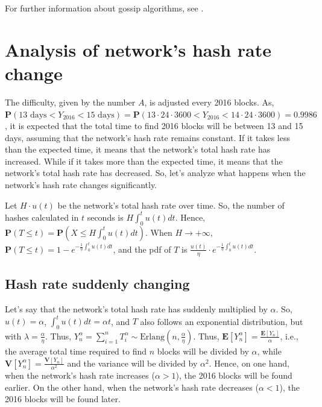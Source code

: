For further information about gossip algorithms, see \citet{shah2009gossip}.


\section{Analysis of network's hash rate change}

The difficulty, given by the number $A$, is adjusted every 2016 blocks. As, $\mathbf{P}(13 \text{ days} < Y_{2016} < 15 \text{ days}) = \mathbf{P}(13 \cdot 24 \cdot 3600 < Y_{2016} < 14 \cdot 24 \cdot 3600) = 0.9986$, it is expected that the total time to find 2016 blocks will be between 13 and 15 days, assuming that the network's hash rate remains constant. If it takes less than the expected time, it means that the network's total hash rate has increased. While if it takes more than the expected time, it means that the network's total hash rate has decreased. So, let's analyze what happens when the network's hash rate changes significantly.


Let $H \cdot u(t)$ be the network's total hash rate over time. So, the number of hashes calculated in $t$ seconds is $H \int_0^t u(t) dt$. Hence, $\mathbf{P}(T \leq t) = \mathbf{P}(X \leq H \int_0^t u(t)dt)$. When $H \rightarrow +\infty$, $\mathbf{P}(T \leq t) = 1 - e^{-\frac{1}{\eta} \int_0^t u(t) dt}$, and the pdf of $T$ is $\frac{u(t)}{\eta} \cdot e^{-\frac{1}{\eta} \int_0^t u(t)dt}$.

\subsection{Hash rate suddenly changing}

Let's say that the network's total hash rate has suddenly multiplied by $\alpha$. So, $u(t) = \alpha$, $\int_0^t u(t) dt = \alpha t$, and $T$ also follows an exponential distribution, but with $\lambda = \frac{\alpha}{\eta}$. Thus, $Y_n^\alpha = \sum_{i=1}^{n} T_i^\alpha \sim \text{Erlang}(n, \frac{\alpha}{\eta})$. Thus, $\mathbf{E}[Y_{n}^\alpha] = \frac{\mathbf{E}[Y_{n}]}{\alpha}$, i.e., the average total time required to find $n$ blocks will be divided by $\alpha$, while $\mathbf{V}[Y_{n}^\alpha] = \frac{\mathbf{V}[Y_n]}{\alpha^2}$ and the variance will be divided by $\alpha^2$. Hence, on one hand, when the network's hash rate increases ($\alpha > 1$), the 2016 blocks will be found earlier. On the other hand, when the network's hash rate decreases ($\alpha < 1$), the 2016 blocks will be found later.

